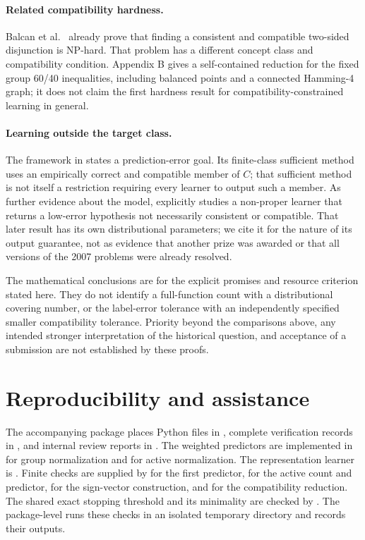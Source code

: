\documentclass[11pt,a4paper]{article}
\theoremstyle{remark}
\newcommand{\1}{\mathbf 1}
\begin{document}
\paragraph{Related compatibility hardness.}
Balcan et al.~\cite[Supplement, Section 2, Theorem 4]{bbel2013supp} already
prove that finding a consistent and compatible two-sided disjunction is
NP-hard. That problem has a different concept class and compatibility
condition. Appendix B gives a self-contained reduction for the fixed group
60/40 inequalities, including balanced points and a connected Hamming-4 graph;
it does not claim the first hardness result for compatibility-constrained
learning in general.

\paragraph{Learning outside the target class.}
The framework in \cite[Section 2]{bb2010} states a prediction-error goal.
Its finite-class sufficient method uses an empirically correct and compatible
member of $C$; that sufficient method is not itself a restriction requiring
every learner to output such a member. As further evidence about the model,
\cite[Section 3.2, Algorithm 2 and Theorem 2]{bbel2013} explicitly studies a
non-proper learner that returns a low-error hypothesis not necessarily
consistent or compatible. That later result has its own distributional
parameters; we cite it for the nature of its output guarantee, not as evidence
that another prize was awarded or that all versions of the 2007 problems were
already resolved.

The mathematical conclusions are for the explicit promises and resource
criterion stated here. They do not identify a full-function count with a
distributional covering number, or the label-error tolerance with an
independently specified smaller compatibility tolerance. Priority beyond the
comparisons above, any intended stronger interpretation of the historical
question, and acceptance of a submission are not established by these proofs.

\section*{Reproducibility and assistance}

The accompanying package places Python files in , complete
verification records in , and internal review reports in
. The weighted predictors are implemented in  for group
normalization and  for active normalization.
The representation learner is .
Finite checks are supplied by  for the first predictor,
 for the active count and predictor,
 for the sign-vector construction, and
 for the compatibility reduction.
The shared exact stopping threshold and its minimality are checked by
. The package-level 
runs these checks in an isolated temporary directory and records their outputs.
\end{document}
